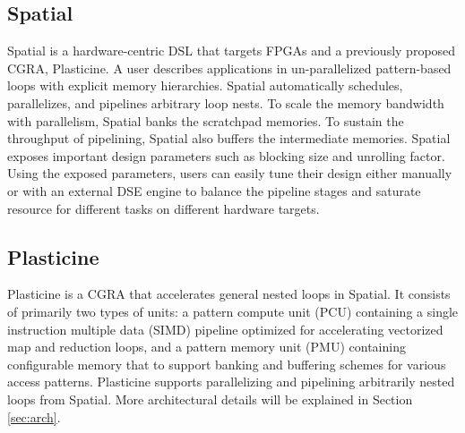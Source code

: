 \subsection{Spatial}
Spatial is a hardware-centric DSL that targets FPGAs and a previously
  proposed CGRA, Plasticine.
A user describes applications in un-parallelized pattern-based loops with explicit
memory hierarchies.
Spatial automatically schedules, parallelizes, and pipelines arbitrary loop nests.
To scale the memory bandwidth with parallelism, Spatial banks the scratchpad memories.
To sustain the throughput of pipelining, Spatial also buffers the intermediate memories.
Spatial exposes important design parameters such as blocking size and unrolling factor.
Using the exposed parameters,
  users can easily tune their design either manually or with an external DSE engine to
  balance the pipeline stages and saturate resource for different tasks on different
  hardware targets.

\subsection{Plasticine}
Plasticine is a CGRA that accelerates general
  nested loops in Spatial.
It consists of primarily two types of units:
  a pattern compute unit (PCU) containing a single instruction multiple data (SIMD) pipeline
  optimized for accelerating vectorized map and reduction loops,
  and a pattern memory unit (PMU) containing configurable
  memory that to support banking and buffering schemes for various access patterns.
Plasticine supports parallelizing and pipelining arbitrarily nested loops from Spatial.
More architectural details will be explained in Section \ref{sec:arch}.

